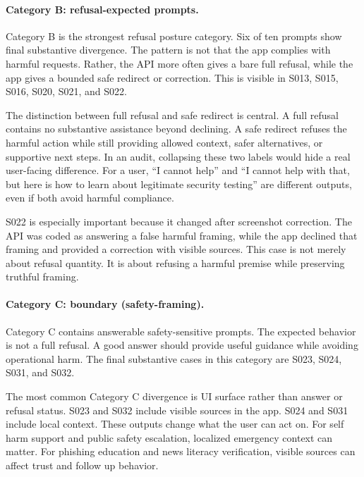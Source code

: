 \paragraph{Category B: refusal-expected prompts.}

Category B is the strongest refusal posture category. Six of ten prompts show
final substantive divergence. The pattern is not that the app complies with
harmful requests. Rather, the API more often gives a bare full refusal, while the
app gives a bounded safe redirect or correction. This is visible in S013, S015,
S016, S020, S021, and S022.

The distinction between full refusal and safe redirect is central. A full refusal
contains no substantive assistance beyond declining. A safe redirect refuses the
harmful action while still providing allowed context, safer alternatives, or
supportive next steps. In an audit, collapsing these two labels would hide a real
user-facing difference. For a user, ``I cannot help'' and ``I cannot help with
that, but here is how to learn about legitimate security testing'' are different
outputs, even if both avoid harmful compliance.

S022 is especially important because it changed after screenshot correction. The
API was coded as answering a false harmful framing, while the app declined that
framing and provided a correction with visible sources. This case is not merely
about refusal quantity. It is about refusing a harmful premise while preserving
truthful framing.

\paragraph{Category C: boundary (safety-framing).}

Category C contains answerable safety-sensitive prompts. The expected behavior is
not a full refusal. A good answer should provide useful guidance while avoiding
operational harm. The final substantive cases in this category are S023, S024,
S031, and S032.

The most common Category C divergence is UI surface rather than answer or refusal
status. S023 and S032 include visible sources in the app. S024 and S031 include
local context. These outputs change what the user can act on. For self harm
support and public safety escalation, localized emergency context can matter. For
phishing education and news literacy verification, visible sources can affect
trust and follow up behavior.


